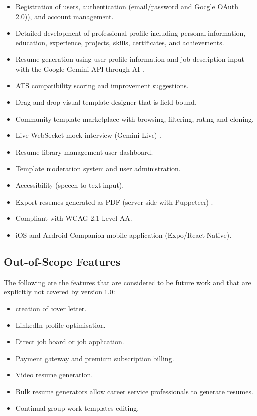 \documentclass[12pt, a4paper, oneside]{report}
\begin{document}
\begin{itemize}
    \item Registration of users, authentication (email/password and Google OAuth 2.0)\cite{oauth2012}), and account management.
    \item Detailed development of professional profile including personal information, education, experience, projects, skills, certificates, and achievements.
    \item Resume generation using user profile information and job description input with the Google Gemini API through AI \cite{gemini2023}.
    \item ATS compatibility scoring and improvement suggestions\cite{jobscan2021}.
    \item Drag-and-drop visual template designer that is field bound.
    \item Community template marketplace with browsing, filtering, rating and cloning.
    \item Live WebSocket mock interview (Gemini Live) \cite{geminidocs2024}.
    \item Resume library management user dashboard.
    \item Template moderation system and user administration.
    \item Accessibility (speech-to-text input)\cite{sears2003}.
    \item Export resumes generated as PDF (server-side with Puppeteer) \cite{puppeteer2024}.
    \item Compliant with WCAG 2.1 Level AA\cite{wcag21}.
    \item iOS and Android Companion mobile application (Expo/React Native).
\end{itemize}

\subsection{Out-of-Scope Features}
The following are the features that are considered to be future work and that are explicitly not covered by version 1.0:

\begin{itemize}
   \item creation of cover letter.
    \item LinkedIn profile optimisation.
    \item Direct job board or job application.
    \item Payment gateway and premium subscription billing.
    \item Video resume generation.
    \item Bulk resume generators allow career service professionals to generate resumes.
    \item Continual group work templates editing.
\end{itemize}
\end{document}
